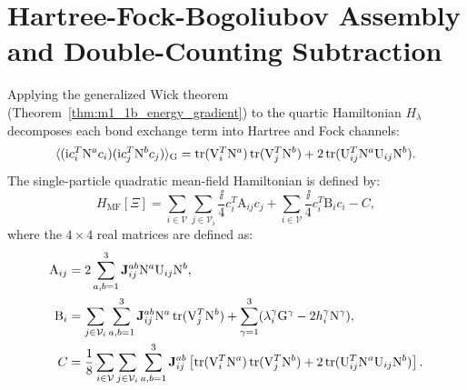 \section{Hartree-Fock-Bogoliubov Assembly and Double-Counting Subtraction}
\label{sec:m1_2_hfb_assembly}
Applying the generalized Wick theorem (Theorem~\ref{thm:m1_1b_energy_gradient}) to the quartic Hamiltonian $H_\lambda$ decomposes each bond exchange term into Hartree and Fock channels:
\begin{equation}
\label{eq:m1_2_wick_channels}
\langle (\mathrm{i} c_i^T \mathrm{N}^a c_i)(\mathrm{i} c_j^T \mathrm{N}^b c_j) \rangle_{\mathrm{G}} = \operatorname{tr}(\mathrm{V}_i^T \mathrm{N}^a) \operatorname{tr}(\mathrm{V}_j^T \mathrm{N}^b) + 2 \operatorname{tr}(\mathrm{U}_{ij}^T \mathrm{N}^a \mathrm{U}_{ij} \mathrm{N}^b).
\end{equation}
The single-particle quadratic mean-field Hamiltonian is defined by:
\begin{equation}
\label{eq:m1_2_H_MF_real_space}
H_{\mathrm{MF}}[\Xi] = \sum_{i \in \mathcal{V}} \sum_{j \in \mathcal{V}_i} \frac{\ii}{4} c_i^T \mathrm{A}_{ij} c_j + \sum_{i \in \mathcal{V}} \frac{\ii}{4} c_i^T \mathrm{B}_i c_i - C,
\end{equation}
where the $4 \times 4$ real matrices are defined as:
\begin{align}
\label{eq:m1_2_A_matrix}
\mathrm{A}_{ij} &= 2 \sum_{a,b=1}^3 \mathbf{J}_{ij}^{ab} \mathrm{N}^a \mathrm{U}_{ij} \mathrm{N}^b, \\
\label{eq:m1_2_B_matrix}
\mathrm{B}_i &= \sum_{j \in \mathcal{V}_i} \sum_{a,b=1}^3 \mathbf{J}_{ij}^{ab} \mathrm{N}^a \operatorname{tr}(\mathrm{V}_j^T \mathrm{N}^b) + \sum_{\gamma=1}^3 (\lambda_i^\gamma \mathrm{G}^\gamma - 2 h_i^\gamma \mathrm{N}^\gamma), \\
\label{eq:m1_2_C_scalar}
C &= \frac{1}{8} \sum_{i \in \mathcal{V}} \sum_{j \in \mathcal{V}_i} \sum_{a,b=1}^3 \mathbf{J}_{ij}^{ab} \left[ \operatorname{tr}(\mathrm{V}_i^T \mathrm{N}^a) \operatorname{tr}(\mathrm{V}_j^T \mathrm{N}^b) + 2 \operatorname{tr}(\mathrm{U}_{ij}^T \mathrm{N}^a \mathrm{U}_{ij} \mathrm{N}^b) \right].
\end{align}

